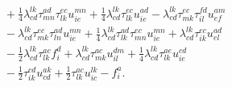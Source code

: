 \begin{align}
\begin{aligned}
        \\
        &\qquad
        + \frac{1}{4}\lambda^{lk}_{cd} \tau^{ad}_{mn} \tau^{ec}_{lk} u^{mn}_{ie}
        + \frac{1}{4}\lambda^{lk}_{cd} \tau^{ec}_{lk} u^{ad}_{ie}
        - \lambda^{lk}_{cd} \tau^{ec}_{mk} \tau^{fd}_{il} u^{am}_{ef}
        \\
        &\qquad
        - \lambda^{lk}_{cd} \tau^{ec}_{mk} \tau^{ad}_{ln} u^{mn}_{ie}
        + \frac{1}{4}\lambda^{lk}_{cd} \tau^{ad}_{lk} \tau^{ec}_{mn} u^{mn}_{ie}
        + \lambda^{lk}_{cd} \tau^{ec}_{ik} u^{ad}_{el}
        \\
        &\qquad
        - \frac{1}{2}\lambda^{lk}_{cd} \tau^{ac}_{lk} f^{d}_{i}
        + \lambda^{lk}_{cd} \tau^{ac}_{mk} u^{dm}_{il}
        + \frac{1}{4}\lambda^{lk}_{cd} \tau^{ae}_{lk} u^{cd}_{ie}
        \\
        &\qquad
        - \frac{1}{2}\tau^{cd}_{ik} u^{ak}_{cd}
        + \frac{1}{2}\tau^{ac}_{lk} u^{lk}_{ic}
        - f^{a}_{i}.
    \end{aligned}
\end{align}